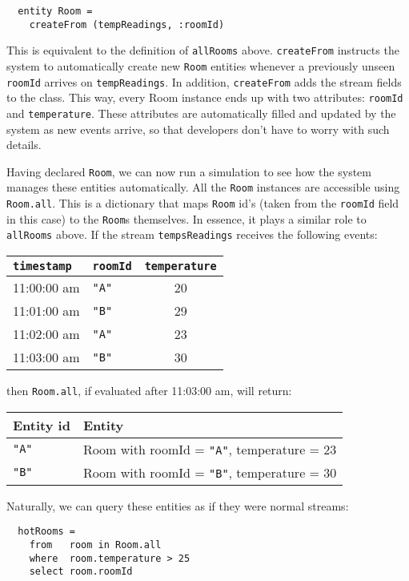 \documentclass[a4,11pt]{report}
\begin{document}
\begin{lstlisting}
  entity Room =
    createFrom (tempReadings, :roomId)
\end{lstlisting}

This is equivalent to the definition of \verb=allRooms=
above. \verb=createFrom= instructs the system to automatically create
new \verb=Room= entities whenever a previously unseen \verb=roomId=
arrives on \verb=tempReadings=. In addition, \verb=createFrom= adds
the stream fields to the class. This way, every Room instance ends up
with two attributes: \verb=roomId= and \verb=temperature=. These
attributes are automatically filled and updated by the system as new
events arrive, so that developers don't have to worry with such
details.

Having declared \verb=Room=, we can now run a simulation to see how
the system manages these entities automatically. All the \verb=Room=
instances are accessible using \verb=Room.all=. This is a dictionary
that maps \verb=Room= id's (taken from the \verb=roomId= field in
this case) to the \verb=Room=s themselves. In essence, it plays a similar
role to \verb=allRooms= above. If the stream \verb=tempsReadings=
receives the following events:

\begin{tabular}{ |l|l|c| }
  \hline
  \verb=timestamp= & \verb=roomId= & \verb=temperature= \\
  \hline
  11:00:00 am & \verb="A"= & 20 \\
  11:01:00 am & \verb="B"= & 29 \\
  11:02:00 am & \verb="A"= & 23 \\
  11:03:00 am & \verb="B"= & 30 \\
  \hline
\end{tabular}

then \verb=Room.all=, if evaluated after 11:03:00 am, will return:

\begin{tabular}{ |l|l| }
  \hline
  Entity id & Entity \\
  \hline
  \verb="A"= & Room with roomId = \verb="A"=, temperature = 23 \\
  \verb="B"= & Room with roomId = \verb="B"=, temperature = 30 \\
  \hline
\end{tabular}

Naturally, we can query these entities as if they were normal streams:

\begin{lstlisting}
  hotRooms =
    from   room in Room.all
    where  room.temperature > 25
    select room.roomId
\end{lstlisting}
\end{document}
